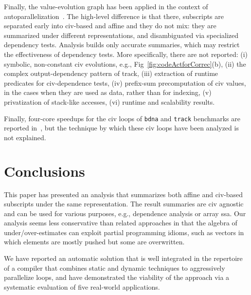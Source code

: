 \documentclass{sig-alternate}
\begin{document}
Finally, the value-evolution graph has been applied in the context of 
autoparallelization~\cite{VEG}.   The high-level difference is that there, 
subscripts are separated early into {\sc civ}-based and affine and they 
do not mix: they are summarized under different representations, 
and disambiguated via specialized dependency tests.
Analysis builds only accurate summaries, which may restrict the
effectiveness of dependency tests. 
More specifically, there are not reported:
  (i)   symbolic, non-constant {\sc civ} evolutions,
        e.g., Fig~\ref{fig:codeActforCorrec}(b),
 (ii) the complex output-dependency pattern of {\sc track},
(iii) extraction of runtime predicates for {\sc civ}-dependence tests,
 (iv) prefix-sum precomputation of {\sc civ} values, in the
        cases when they are used as data, rather than for indexing,
  (v) privatization of stack-like accesses, 
 (vi) runtime and scalability results.

Finally, four-core speedups for the {\sc civ} loops of {\tt bdna} and 
{\tt track} benchmarks are reported in~\cite{CosPLDI}, but the technique 
by which these {\sc civ} loops have been analyzed is not explained. 


\section{Conclusions}
\label{sec:Concl}

This paper has presented an analysis that summarizes both 
affine and {\sc civ}-based subscripts under the same 
representation. 
%
%
%
The result summaries are {\sc civ} agnostic and can be used for 
various  purposes, e.g., dependence analysis or array {\sc ssa}. 
%
Our analysis seems less conservative than related approaches 
in that the algebra of under/over-estimates can exploit partial 
programming idioms, such as vectors in which elements are mostly 
pushed but some are overwritten. %

We have reported an automatic solution that is well integrated 
in the repertoire of a compiler that combines static and dynamic 
techniques to aggressively parallelize loops, and have 
demonstrated the viability of the approach via a systematic
evaluation of five real-world applications.
\end{document}
